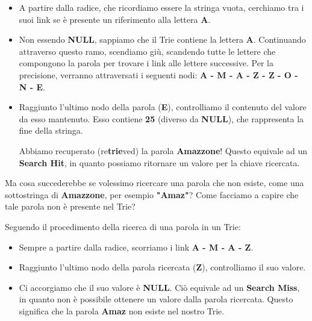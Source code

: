 \documentclass[a4paper, 12pt]{article}
\begin{document}
\begin{itemize}
    
    \item A partire dalla radice, che ricordiamo essere la stringa vuota, cerchiamo tra i suoi link se è presente un riferimento alla lettera \textbf{A}.
    
    \item Non essendo \textbf{NULL}, sappiamo che il Trie contiene la lettera \textbf{A}. Continuando attraverso questo ramo, scendiamo giù, scandendo tutte le lettere che compongono la parola per trovare i link alle lettere successive. Per la precisione, verranno attraversati i seguenti nodi: \textbf{A - M - A - Z - Z - O - N - E}.
    
    \item Raggiunto l'ultimo nodo della parola (\textbf{E}), controlliamo il contenuto del valore da esso mantenuto. Esso contiene \textbf{25} (diverso da \textbf{NULL}), che rappresenta la fine della stringa. 
    
    Abbiamo recuperato (re\textbf{trie}ved) la parola \textbf{Amazzone}! Questo equivale ad un \textbf{Search Hit}, in quanto possiamo ritornare un valore per la chiave ricercata.
    
\end{itemize}

Ma cosa succederebbe se volessimo ricercare una parola che non esiste, come una sottostringa di \textbf{Amazzone}, per esempio \textbf{"Amaz"}? Come facciamo a capire che tale parola non è presente nel Trie?

\clearpage

Seguendo il procedimento della ricerca di una parola in un Trie:

\begin{itemize}
    
    \item Sempre a partire dalla radice, scorriamo i link \textbf{A - M - A - Z}.
    
    \item Raggiunto l'ultimo nodo della parola ricercata (\textbf{Z}), controlliamo il suo valore.
    
    \item Ci accorgiamo che il suo valore è \textbf{NULL}. Ciò equivale ad un \textbf{Search Miss}, in quanto non è possibile ottenere un valore dalla parola ricercata. Questo significa che la parola \textbf{Amaz} non esiste nel nostro Trie.
    
\end{itemize}
\end{document}
